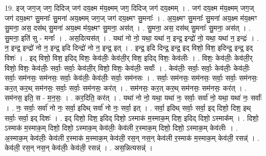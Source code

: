 \documentclass[17pt]{extarticle}
\begin{document}
19. इज् जग॒ज् जग॒ दिदिज् जग॑ दय॒क्ष्म म॑य॒क्ष्मम् जग॒ दिदिज् जग॑ दय॒क्ष्मम् । . जग॑ दय॒क्ष्म म॑य॒क्ष्मम् जग॒ज् जग॑ दय॒क्ष्मꣳ सु॒मनाः᳚ सु॒मना॑ अय॒क्ष्मम् जग॒ज् जग॑ दय॒क्ष्मꣳ सु॒मनाः᳚ । . अ॒य॒क्ष्मꣳ सु॒मनाः᳚ सु॒मना॑ अय॒क्ष्म म॑य॒क्ष्मꣳ सु॒मना॒ अस॒ दस॑थ् सु॒मना॑ अय॒क्ष्म म॑य॒क्ष्मꣳ सु॒मना॒ अस॑त् । . सु॒मना॒ अस॒ दस॑थ् सु॒मनाः᳚ सु॒मना॒ अस॑त् । . सु॒मना॒ इति॑ सु - मनाः᳚ । . अस॒दित्यस॑त् । . यथा॑ नो नो॒ यथा॒ यथा॑ न॒ इन्द्र॒ इन्द्रो॑ नो॒ यथा॒ यथा॑ न॒ इन्द्रः॑ । . न॒ इन्द्र॒ इन्द्रो॑ नो न॒ इन्द्र॒ इदि दिन्द्रो॑ नो न॒ इन्द्र॒ इत् । . इन्द्र॒ इदि दिन्द्र॒ इन्द्र॒ इद् विशो॒ विश॒ इदिन्द्र॒ इन्द्र॒ इद् विशः॑ । . इद् विशो॒ विश॒ इदिद् विशः॒ केव॑लीः॒ केव॑ली॒र् विश॒ इदिद् विशः॒ केव॑लीः । . विशः॒ केव॑लीः॒ केव॑ली॒र् विशो॒ विशः॒ केव॑लीः॒ सर्वाः॒ सर्वाः॒ केव॑ली॒र् विशो॒ विशः॒ केव॑लीः॒ सर्वाः᳚ । . केव॑लीः॒ सर्वाः॒ सर्वाः॒ केव॑लीः॒ केव॑लीः॒ सर्वाः॒ सम॑नसः॒ सम॑नसः॒ सर्वाः॒ केव॑लीः॒ केव॑लीः॒ सर्वाः॒ सम॑नसः । . सर्वाः॒ सम॑नसः॒ सम॑नसः॒ सर्वाः॒ सर्वाः॒ सम॑नसः॒ कर॒त् कर॒थ् सम॑नसः॒ सर्वाः॒ सर्वाः॒ सम॑नसः॒ कर॑त् । . सम॑नसः॒ कर॒त् कर॒थ् सम॑नसः॒ सम॑नसः॒ कर॑त् । . सम॑नस॒ इति॒ स - म॒न॒सः॒ । . कर॒दिति॒ कर॑त् । . यथा॑ नो नो॒ यथा॒ यथा॑ नः॒ सर्वाः॒ सर्वा॑ नो॒ यथा॒ यथा॑ नः॒ सर्वाः᳚ । . नः॒ सर्वाः॒ सर्वा॑ नो नः॒ सर्वा॒ इदिथ् सर्वा॑ नो नः॒ सर्वा॒ इत् । . सर्वा॒ इदिथ् सर्वाः॒ सर्वा॒ इद् दिशो॒ दिश॒ इथ् सर्वाः॒ सर्वा॒ इद् दिशः॑ । . इद् दिशो॒ दिश॒ इदिद् दिशो॒ ऽस्माक॑ म॒स्माक॒म् दिश॒ इदिद् दिशो॒ ऽस्माक᳚म् । . दिशो॒ ऽस्माक॑ म॒स्माक॒म् दिशो॒ दिशो॒ ऽस्माक॒म् केव॑लीः॒ केव॑ली र॒स्माक॒म् दिशो॒ दिशो॒ ऽस्माक॒म् केव॑लीः । . अ॒स्माक॒म् केव॑लीः॒ केव॑ली र॒स्माक॑ म॒स्माक॒म् केव॑ली॒ रस॒न् नस॒न् केव॑ली र॒स्माक॑ म॒स्माक॒म् केव॑ली॒ रसन्न्॑ । . केव॑ली॒ रस॒न् नस॒न् केव॑लीः॒ केव॑ली॒ रसन्न्॑ । . अस॒न्नित्यसन्न्॑ । \newline
\pagebreak
{}
\end{document}
